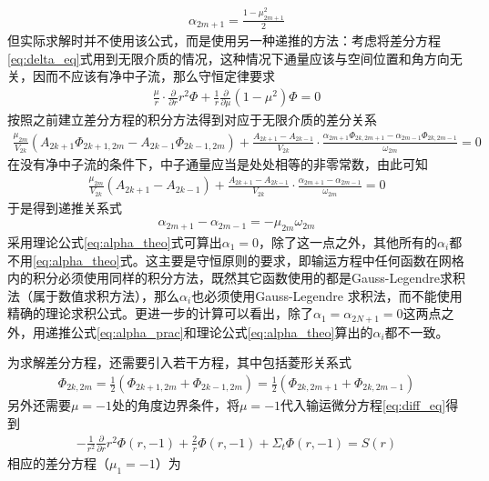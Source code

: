 \documentclass[a4paper,10.5pt]{article}
\begin{document}
\begin{align}
\alpha_{2m+1}=\frac{1-\mu_{2m+1}^{2}}{2}\label{eq:alpha_theo}
\end{align}
但实际求解时并不使用该公式，而是使用另一种递推的方法：考虑将差分方程\eqref{eq:delta_eq}式用到无限介质的情况，这种情况下通量应该与空间位置和角方向无关，因而不应该有净中子流，那么守恒定律要求
\begin{align*}
\frac{\mu}{r}\cdot\frac{\partial}{\partial{}r}r^{2}\Phi+\frac{1}{r}\frac{\partial}{\partial\mu}(1-\mu^{2})\Phi=0
\end{align*}
按照之前建立差分方程的积分方法得到对应于无限介质的差分关系
\begin{align*}
\frac{\mu_{2m}}{V_{2k}}(A_{2k+1}\Phi_{2k+1,2m}-A_{2k-1}\Phi_{2k-1,2m})+\frac{A_{2k+1}-A_{2k-1}}{V_{2k}}\cdot\frac{\alpha_{2m+1}\Phi_{2k,2m+1}-\alpha_{2m-1}\Phi_{2k,2m-1}}{\omega_{2m}}=0
\end{align*}
在没有净中子流的条件下，中子通量应当是处处相等的非零常数，由此可知
\begin{align*}
\frac{\mu_{2m}}{V_{2k}}(A_{2k+1}-A_{2k-1})+\frac{A_{2k+1}-A_{2k-1}}{V_{2k}}\cdot\frac{\alpha_{2m+1}-\alpha_{2m-1}}{\omega_{2m}}=0
\end{align*}
于是得到递推关系式
\begin{align}
\alpha_{2m+1}-\alpha_{2m-1}=-\mu_{2m}\omega_{2m}\label{eq:alpha_prac}
\end{align}
采用理论公式\eqref{eq:alpha_theo}式可算出$\alpha_{1}=0$，除了这一点之外，其他所有的$\alpha_{i}$都不用\eqref{eq:alpha_theo}式。这主要是守恒原则的要求，即输运方程中任何函数在网格内的积分必须使用同样的积分方法，既然其它函数使用的都是Gauss-Legendre求积法（属于数值求积方法），那么$\alpha_{i}$也必须使用Gauss-Legendre 求积法，而不能使用精确的理论求积公式。更进一步的计算可以看出，除了$\alpha_{1}=\alpha_{2N+1}=0$这两点之外，用递推公式\eqref{eq:alpha_prac}和理论公式\eqref{eq:alpha_theo}算出的$\alpha_{i}$都不一致。\par
为求解差分方程，还需要引入若干方程，其中包括菱形关系式
\begin{align}
\Phi_{2k,2m}=\frac{1}{2}\left(\Phi_{2k+1,2m}+\Phi_{2k-1,2m}\right)=\frac{1}{2}\left(\Phi_{2k,2m+1}+\Phi_{2k,2m-1}\right)
\end{align}
另外还需要$\mu=-1$处的角度边界条件，将$\mu=-1$代入输运微分方程\eqref{eq:diff_eq}得到
\begin{align*}
-\frac{1}{r^{2}}\frac{\partial}{\partial{}r}r^{2}\Phi(r,-1)+\frac{2}{r}\Phi(r,-1)+\Sigma_{t}\Phi(r,-1)=S(r)
\end{align*}
相应的差分方程（$\mu_{1}=-1$）为
\end{document}
